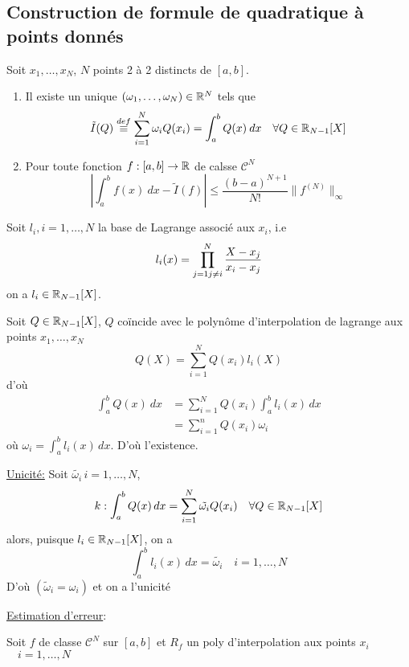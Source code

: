 \documentclass[a4paper]{report}
\begin{document}
\subsection{Construction de formule de quadratique à points donnés}
\begin{prop}
    Soit $x_1, \ldots, x_N$, $N$ points 2 à 2 distincts de  $[a, b]$. 
    \begin{enumerate}
        \item Il existe un unique $(\omega_1, \ldots, \omega_N) \in \mathbb{R}^N$ tels que 
            \[
                \tilde{I}(Q) \overset{def}{\equiv} \sum_{i=1}^{N} \omega_iQ(x_i) = \int_{{a}}^{{b}} {Q(x)} \: d{x} \quad \forall Q \in \mathbb{R}_{N-1}[X]
            \] 
        \item Pour toute fonction $f: [a, b] \to \mathbb{R}$ de calsse $\mathcal{C}^N$
             \[
                 \left| \int_{{a}}^{{b}} {f(x)} \: d{x} - \tilde{I}(f) \right| \le \frac{(b-a)^{N+1}}{N!}\|f^{(N)}\|_{\infty}
            \] 
    \end{enumerate}
\end{prop}
\begin{preuve}
   Soit $l_i, i = 1, \ldots, N$  la base de Lagrange associé aux $x_i$, i.e
    \[
        l_i(x) = \prod_{\substack{j=1}\\ \substack{j\neq i}}^{N}  \frac{X - x_j}{x_i - x_j} 
   \] 
   on a $l_i \in \mathbb{R}_{N-1}[X]$.
   \par
   Soit $Q \in \mathbb{R}_{N-1}[X]$, $Q$ coïncide avec le polynôme d'interpolation de lagrange aux points  $x_1, \ldots, x_N$
   \[
   Q(X) = \sum_{i=1}^{N} Q(x_i)l_i(X)
   \] 
   d'où
   \begin{align*}
       \int_{{a}}^{{b}} {Q(x)} \: d{x} &= \sum_{i=1}^{N} Q(x_i)\int_{a}^{b} l_i(x) \, d{x}\\ 
                                       &= \sum_{i=1}^{n} Q(x_i)\omega_i
   \end{align*}
   où $\omega_i = \int_{a}^{b} l_i(x) \, d{x} $. D'où l'existence.\par
   \underline{Unicité:}
   Soit $\tilde{\omega_i} \, i = 1, \ldots, N$, 
   \[
       k: \int_{a}^{b} Q(x) \, d{x} = \sum_{i=1}^{N} \tilde{\omega_i}Q(x_i) \quad \forall Q \in \mathbb{R}_{N-1}[X] 
   \] 
   alors, puisque $l_i \in \mathbb{R}_{N-1}[X]$, on a
   \[
       \int_{a}^{b} l_i(x) \, d{x} = \tilde{\omega_i} \quad i = 1, \ldots, N 
   \] 
   D'où $(\tilde{\omega}_i = \omega_i)$ et on a l'unicité

   \par
   \underline{Estimation d'erreur}:
   \par
   Soit $f$ de classe  $\mathcal{C}^N$ sur  $[a, b]$ et  $R_f$ un poly d'interpolation aux points  $x_i$  $\quad i = 1, \ldots, N$
\end{preuve}
\end{document}

